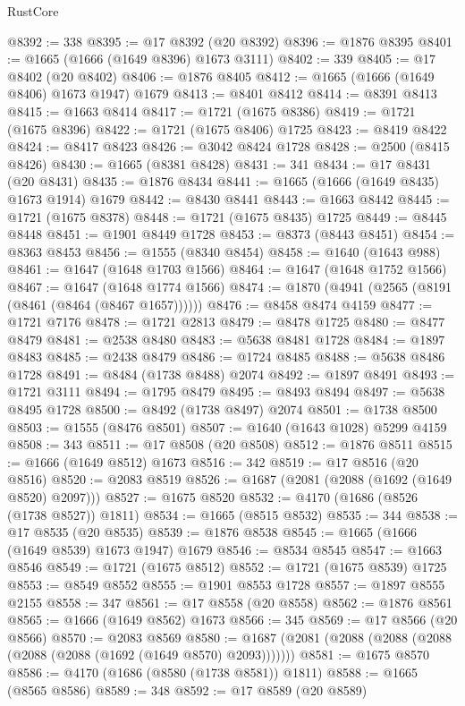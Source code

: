 \begin{lexlean}{RustCore}
\begin{coremodule}
@8392 := 338
@8395 := @17 @8392 (@20 @8392)
@8396 := @1876 @8395
@8401 := @1665 (@1666 (@1649 @8396) @1673 @3111)
@8402 := 339
@8405 := @17 @8402 (@20 @8402)
@8406 := @1876 @8405
@8412 := @1665 (@1666 (@1649 @8406) @1673 @1947) @1679
@8413 := @8401 @8412
@8414 := @8391 @8413
@8415 := @1663 @8414
@8417 := @1721 (@1675 @8386)
@8419 := @1721 (@1675 @8396)
@8422 := @1721 (@1675 @8406) @1725
@8423 := @8419 @8422
@8424 := @8417 @8423
@8426 := @3042 @8424 @1728
@8428 := @2500 (@8415 @8426)
@8430 := @1665 (@8381 @8428)
@8431 := 341
@8434 := @17 @8431 (@20 @8431)
@8435 := @1876 @8434
@8441 := @1665 (@1666 (@1649 @8435) @1673 @1914) @1679
@8442 := @8430 @8441
@8443 := @1663 @8442
@8445 := @1721 (@1675 @8378)
@8448 := @1721 (@1675 @8435) @1725
@8449 := @8445 @8448
@8451 := @1901 @8449 @1728
@8453 := @8373 (@8443 @8451)
@8454 := @8363 @8453
@8456 := @1555 (@8340 @8454)
@8458 := @1640 (@1643 @988)
@8461 := @1647 (@1648 @1703 @1566)
@8464 := @1647 (@1648 @1752 @1566)
@8467 := @1647 (@1648 @1774 @1566)
@8474 := @1870 (@4941 (@2565 (@8191 (@8461 (@8464 (@8467 @1657))))))
@8476 := @8458 @8474 @4159
@8477 := @1721 @7176
@8478 := @1721 @2813
@8479 := @8478 @1725
@8480 := @8477 @8479
@8481 := @2538 @8480
@8483 := @5638 @8481 @1728
@8484 := @1897 @8483
@8485 := @2438 @8479
@8486 := @1724 @8485
@8488 := @5638 @8486 @1728
@8491 := @8484 (@1738 @8488) @2074
@8492 := @1897 @8491
@8493 := @1721 @3111
@8494 := @1795 @8479
@8495 := @8493 @8494
@8497 := @5638 @8495 @1728
@8500 := @8492 (@1738 @8497) @2074
@8501 := @1738 @8500
@8503 := @1555 (@8476 @8501)
@8507 := @1640 (@1643 @1028) @5299 @4159
@8508 := 343
@8511 := @17 @8508 (@20 @8508)
@8512 := @1876 @8511
@8515 := @1666 (@1649 @8512) @1673
@8516 := 342
@8519 := @17 @8516 (@20 @8516)
@8520 := @2083 @8519
@8526 := @1687 (@2081 (@2088 (@1692 (@1649 @8520) @2097)))
@8527 := @1675 @8520
@8532 := @4170 (@1686 (@8526 (@1738 @8527)) @1811)
@8534 := @1665 (@8515 @8532)
@8535 := 344
@8538 := @17 @8535 (@20 @8535)
@8539 := @1876 @8538
@8545 := @1665 (@1666 (@1649 @8539) @1673 @1947) @1679
@8546 := @8534 @8545
@8547 := @1663 @8546
@8549 := @1721 (@1675 @8512)
@8552 := @1721 (@1675 @8539) @1725
@8553 := @8549 @8552
@8555 := @1901 @8553 @1728
@8557 := @1897 @8555 @2155
@8558 := 347
@8561 := @17 @8558 (@20 @8558)
@8562 := @1876 @8561
@8565 := @1666 (@1649 @8562) @1673
@8566 := 345
@8569 := @17 @8566 (@20 @8566)
@8570 := @2083 @8569
@8580 := @1687 (@2081 (@2088 (@2088 (@2088 (@2088 (@2088 (@1692 (@1649 @8570) @2093)))))))
@8581 := @1675 @8570
@8586 := @4170 (@1686 (@8580 (@1738 @8581)) @1811)
@8588 := @1665 (@8565 @8586)
@8589 := 348
@8592 := @17 @8589 (@20 @8589)

\end{coremodule}
\end{lexlean}

